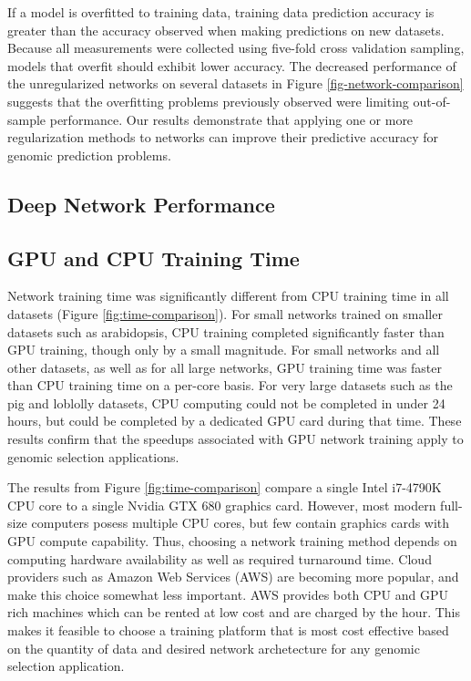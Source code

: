 If a model is overfitted to training data, training data prediction accuracy is greater than 
the accuracy observed when making predictions on new datasets. Because all measurements were collected 
using five-fold cross validation sampling, models that overfit should exhibit lower accuracy. 
The decreased performance of the unregularized networks on several datasets in Figure 
\ref{fig-network-comparison} suggests that the overfitting problems 
previously observed were limiting out-of-sample performance. Our results demonstrate that 
applying one or more regularization methods to networks can improve their 
predictive accuracy for genomic prediction problems.

\ifdefined\showtablesandfigures
\fi

\subsection*{Deep Network Performance}

\ifdefined\showtablesandfigures
\fi

\subsection*{GPU and CPU Training Time}

Network training time was significantly different from CPU training time in all datasets (Figure \ref{fig:time-comparison}).
For small networks trained on smaller datasets such as arabidopsis, CPU training completed significantly faster than GPU training, though only
by a small magnitude. For small networks and all other datasets, as well as for all large networks, GPU training time was faster than 
CPU training time on a per-core basis. For very large datasets such as the pig and loblolly datasets, CPU computing could not be 
completed in under 24 hours, but could be completed by a dedicated GPU card during that time. These results confirm that the 
speedups associated with GPU network training apply to genomic selection applications.  

The results from Figure \ref{fig:time-comparison} compare a single Intel i7-4790K CPU core to a single Nvidia GTX 680 graphics card.
However, most modern full-size computers posess multiple CPU cores, but few contain graphics cards with GPU compute capability. 
Thus, choosing a network training method depends on computing hardware availability as well as required turnaround time. Cloud providers such 
as Amazon Web Services (AWS) are becoming more popular, and make this choice somewhat less important. AWS provides both CPU and GPU rich 
machines which can be rented at low cost and are charged by the hour. This makes it feasible to choose a training platform 
that is most cost effective based on the quantity of data and desired network archetecture for any genomic selection application.

